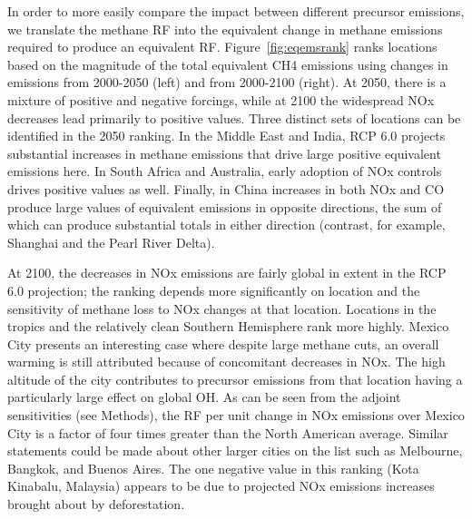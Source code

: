 In order to more easily compare the impact between different precursor emissions, we translate the methane RF into the equivalent change in methane emissions required to produce an equivalent RF. Figure~\ref{fig:eqemsrank} ranks locations based on the magnitude of the total equivalent CH4 emissions using changes in emissions from 2000-2050 (left) and from 2000-2100 (right). At 2050, there is a mixture of positive and negative forcings, while at 2100 the widespread NOx decreases lead primarily to positive values. Three distinct sets of locations can be identified in the 2050 ranking. In the Middle East and India, RCP 6.0 projects substantial increases in methane emissions that drive large positive equivalent emissions here. In South Africa and Australia, early adoption of NOx controls drives positive values as well. Finally, in China increases in both NOx and CO produce large values of equivalent emissions in opposite directions, the sum of which can produce substantial totals in either direction (contrast, for example, Shanghai and the Pearl River Delta).

At 2100, the decreases in NOx emissions are fairly global in extent in the RCP 6.0 projection; the ranking depends more significantly on location and the sensitivity of methane loss to NOx changes at that location. Locations in the tropics and the relatively clean Southern Hemisphere rank more highly. Mexico City presents an interesting case where despite large methane cuts, an overall warming is still attributed because of concomitant decreases in NOx. The high altitude of the city contributes to precursor emissions from that location having a particularly large effect on global OH. As can be seen from the adjoint sensitivities (see Methods), the RF per unit change in NOx emissions over Mexico City is a factor of four times greater than the North American average. Similar statements could be made about other larger cities on the list such as Melbourne, Bangkok, and Buenos Aires. The one negative value in this ranking (Kota Kinabalu, Malaysia) appears to be due to projected NOx emissions increases brought about by deforestation.